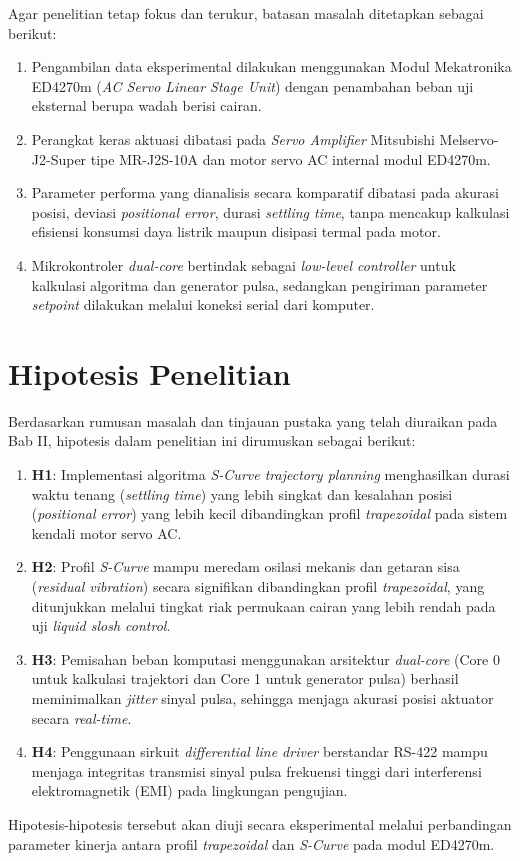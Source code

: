 Agar penelitian tetap fokus dan terukur, batasan masalah ditetapkan sebagai berikut:
\begin{enumerate}
    \item Pengambilan data eksperimental dilakukan menggunakan Modul Mekatronika ED4270m (\textit{AC Servo Linear Stage Unit}) dengan penambahan beban uji eksternal berupa wadah berisi cairan.
    \item Perangkat keras aktuasi dibatasi pada \textit{Servo Amplifier} Mitsubishi Melservo-J2-Super tipe MR-J2S-10A dan motor servo AC internal modul ED4270m.
    \item Parameter performa yang dianalisis secara komparatif dibatasi pada akurasi posisi, deviasi \textit{positional error}, durasi \textit{settling time}, tanpa mencakup kalkulasi efisiensi konsumsi daya listrik maupun disipasi termal pada motor.
    \item Mikrokontroler \textit{dual-core} bertindak sebagai \textit{low-level controller} untuk kalkulasi algoritma dan generator pulsa, sedangkan pengiriman parameter \textit{setpoint} dilakukan melalui koneksi serial dari komputer.
\end{enumerate}

\section{Hipotesis Penelitian}

Berdasarkan rumusan masalah dan tinjauan pustaka yang telah diuraikan pada Bab II, hipotesis dalam penelitian ini dirumuskan sebagai berikut:

\begin{enumerate}
    \item \textbf{H1}: Implementasi algoritma \textit{S-Curve trajectory planning} menghasilkan durasi waktu tenang (\textit{settling time}) yang lebih singkat dan kesalahan posisi (\textit{positional error}) yang lebih kecil dibandingkan profil \textit{trapezoidal} pada sistem kendali motor servo AC.

    \item \textbf{H2}: Profil \textit{S-Curve} mampu meredam osilasi mekanis dan getaran sisa (\textit{residual vibration}) secara signifikan dibandingkan profil \textit{trapezoidal}, yang ditunjukkan melalui tingkat riak permukaan cairan yang lebih rendah pada uji \textit{liquid slosh control}.

    \item \textbf{H3}: Pemisahan beban komputasi menggunakan arsitektur \textit{dual-core} (Core 0 untuk kalkulasi trajektori dan Core 1 untuk generator pulsa) berhasil meminimalkan \textit{jitter} sinyal pulsa, sehingga menjaga akurasi posisi aktuator secara \textit{real-time}.

    \item \textbf{H4}: Penggunaan sirkuit \textit{differential line driver} berstandar RS-422 mampu menjaga integritas transmisi sinyal pulsa frekuensi tinggi dari interferensi elektromagnetik (EMI) pada lingkungan pengujian.
\end{enumerate}

Hipotesis-hipotesis tersebut akan diuji secara eksperimental melalui perbandingan parameter kinerja antara profil \textit{trapezoidal} dan \textit{S-Curve} pada modul ED4270m.